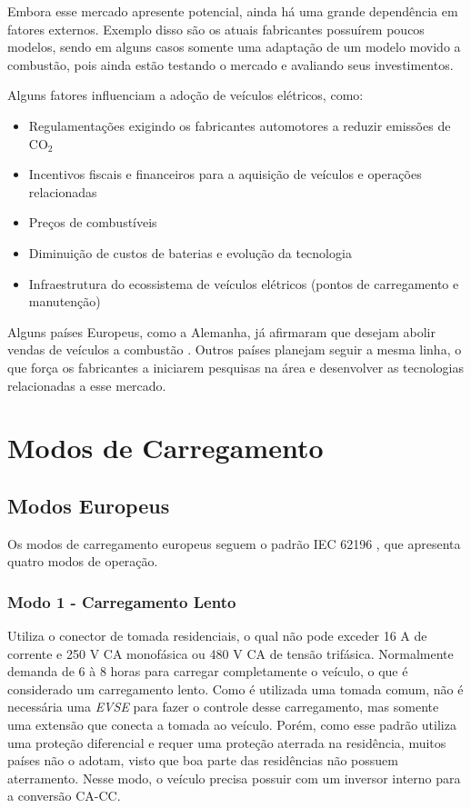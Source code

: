     Embora esse mercado apresente potencial, ainda há uma grande dependência em fatores externos. Exemplo disso são os atuais fabricantes possuírem poucos modelos, sendo em alguns casos somente uma adaptação de um modelo movido a combustão, pois ainda estão testando o mercado e avaliando seus investimentos.

    Alguns fatores influenciam a adoção de veículos elétricos, como:

    \begin{itemize}
      \item Regulamentações exigindo os fabricantes automotores a reduzir emissões de CO$_2$
      \item Incentivos fiscais e financeiros para a aquisição de veículos e operações relacionadas
      \item Preços de combustíveis
      \item Diminuição de custos de baterias e evolução da tecnologia
      \item Infraestrutura do ecossistema de veículos elétricos (pontos de carregamento e manutenção)
    \end{itemize}

    Alguns países Europeus, como a Alemanha, já afirmaram que desejam abolir vendas de veículos a combustão \cite{forbes-news-germany}. Outros países planejam seguir a mesma linha, o que força os fabricantes a iniciarem pesquisas na área e desenvolver as tecnologias relacionadas a esse mercado.

  \section{Modos de Carregamento}
  \label{stateofart:modes}

    \subsection{Modos Europeus}
    \label{stateofart:modes:europe}

      Os modos de carregamento europeus seguem o padrão IEC 62196 \cite{iec-62196}, que apresenta quatro modos de operação.

        \subsubsection{Modo 1 - Carregamento Lento}
        \label{stateofart:modes:europe:mode1}

        Utiliza o conector de tomada residenciais, o qual não pode exceder 16 A de corrente e 250 V \ac{CA} monofásica ou 480 V \ac{CA} de tensão trifásica. Normalmente demanda de 6 à 8 horas para carregar completamente o veículo, o que é considerado um carregamento lento. Como é utilizada uma tomada comum, não é necessária uma \textit{\ac{EVSE}} para fazer o controle desse carregamento, mas somente uma extensão que conecta a tomada ao veículo. Porém, como esse padrão utiliza uma proteção diferencial e requer uma proteção aterrada na residência, muitos países não o adotam, visto que boa parte das residências não possuem aterramento. Nesse modo, o veículo precisa possuir com um inversor interno para a conversão \ac{CA}-\ac{CC}.

